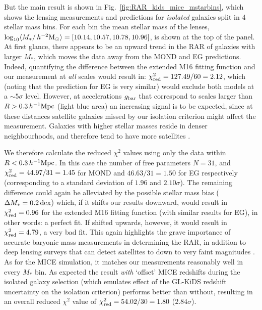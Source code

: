 \documentclass[usenatbib]{mnras}
\newcommand{\hmsun}{\,h^{-2} {\rm M_\odot}}
\newcommand{\hMpc}{\, h^{-1}{\rm{Mpc}} }
\newcommand{\lan}{\langle}
\newcommand{\ran}{\rangle}
\newcommand{\un}[1]{_{\rm #1}}
\newcommand{\dex}{\, {\rm dex}}
\begin{document}
But the main result is shown in Fig.~\ref{fig:RAR_kids_mice_mstarbins}, which shows the lensing measurements and predictions for \emph{isolated} galaxies split in 4 stellar mass bins. For each bin the mean stellar mass of the lenses, $\log_{10}\lan M_*/\hmsun \ran = [10.14, 10.57, 10.78, 10.96]$, is shown at the top of the panel. At first glance, there appears to be an upward trend in the RAR of galaxies with larger $M_*$, which moves the data away from the MOND and EG predictions. Indeed, quantifying the difference between the extended M16 fitting function and our measurement at \emph{all} scales would result in: $\chi\un{red}^2 = 127.49 / 60 = 2.12$, which (noting that the prediction for EG is very similar) would exclude both models at a $\sim5 \sigma$ level. However, at accelerations $g\un{bar}$ that correspond to scales larger than $R > 0.3 \hMpc$ (light blue area) an increasing signal is to be expected, since at these distances satellite galaxies missed by our isolation criterion might affect the measurement. Galaxies with higher stellar masses reside in denser neighbourhoods, and therefore tend to have more satellites \cite[see e.g.]{baldry2006, bolzonella2010, brouwer2016}.

We therefore calculate the reduced $\chi^2$ values using only the data within $R < 0.3 \hMpc$. In this case the number of free parameters $N = 31$, and $\chi\un{red}^2 = 44.97 / 31 = 1.45$ for MOND and $46.63 / 31 = 1.50$ for EG respectively (corresponding to a standard deviation of $1.96$ and $2.10\sigma$). The remaining difference could again be alleviated by the possible stellar mass bias ($\Delta M_* = 0.2 \dex$) which, if it shifts our results downward, would result in $\chi\un{red}^2 = 0.96$ for the extended M16 fitting function (with similar results for EG), in other words: a perfect fit. If shifted upwards, however, it would result in $\chi\un{red}^2=4.79$, a very bad fit. This again highlights the grave importance of accurate baryonic mass measurements in determining the RAR, in addition to deep lensing surveys that can detect satellites to down to very faint magnitudes \cite[such as the future Euclid survey;][]{laureijs2011}. As for the MICE simulation, it matches our measurements reasonably well in every $M_*$ bin. As expected the result \emph{with} `offset' MICE redshifts during the isolated galaxy selection (which emulates effect of the GL-KiDS redshift uncertainty on the isolation criterion) performs better than without, resulting in an overall reduced $\chi^2$ value of $\chi\un{red}^2 = 54.02 / 30 = 1.80$ ($2.84 \sigma$).
\end{document}
